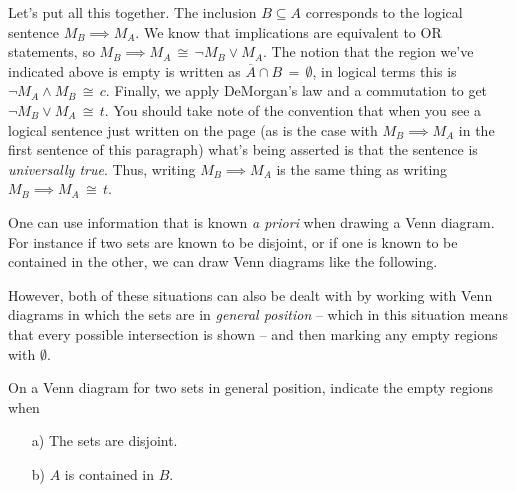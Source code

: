 

\vspace{.1in}

Let's put all this together.  The inclusion $B \subseteq A$ corresponds
to the logical sentence $M_B \implies M_A$.  We know that implications
are equivalent to OR statements, so $M_B \implies M_A \, \cong \, 
{\lnot}M_B \lor M_A$.  The notion that the region we've 
indicated above is empty is written as $\overline{A} \cap B \, = \, \emptyset$,
in logical terms this is ${\lnot}M_A \land M_B \, \cong \, c$.  
Finally, we apply DeMorgan's law and a commutation to get 
${\lnot}M_B \lor M_A \, \cong \, t$.  You should take note of the 
convention that when you see a logical sentence just written on the 
page (as is the case with $M_B \implies M_A$ in the first sentence
of this paragraph) what's being asserted is that the sentence is 
\emph{universally true}.
Thus, writing $M_B \implies M_A$ is the same thing as writing 
$M_B \implies M_A \, \cong \, t$.

One can use information that is known \emph{a priori} when 
drawing a Venn diagram.  For instance if two sets are known 
to be disjoint, or if one is known to be contained in the other,
we can draw Venn diagrams like the following.

\vspace{.1in}



\vspace{.2in}



\vspace{.1in}

However, both of these situations can also be dealt with
by working with Venn diagrams in which the sets are in 
 \emph{general position} -- which
in this situation means that every possible intersection is
shown -- and then marking any empty regions with $\emptyset$.

\begin{exer}
On a Venn diagram for two sets in general position, indicate
the empty regions when
\begin{itemize}
\item[a)] The sets are disjoint.
\item[b)] $A$ is contained in $B$.
\end{itemize}


\end{exer}

